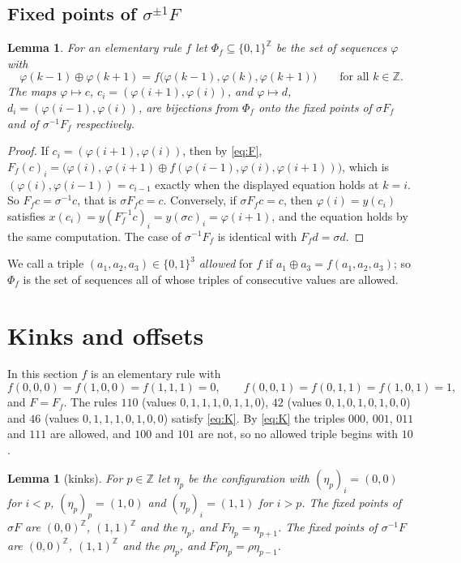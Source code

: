 \documentclass[11pt]{amsart}
\newtheorem{lemma}[theorem]{Lemma}
\theoremstyle{definition}
\theoremstyle{remark}
\theoremstyle{plain}
\newcommand{\Z}{\mathbb{Z}}
\newcommand{\sh}{\sigma}
\begin{document}
\subsection{Fixed points of \texorpdfstring{$\sh^{\pm1}F$}{sigma F}}\label{sec:fixed}

\begin{lemma}\label{cl:lem:Z2}
For an elementary rule $f$ let $\Phi_f\subseteq\{0,1\}^{\Z}$ be the set of sequences $\varphi$ with
\[
\varphi(k-1)\oplus\varphi(k+1)=f\bigl(\varphi(k-1),\varphi(k),\varphi(k+1)\bigr)\qquad\text{for all }k\in\Z.
\]
The maps $\varphi\mapsto c$, $c_i=(\varphi(i+1),\varphi(i))$, and $\varphi\mapsto d$, $d_i=(\varphi(i-1),\varphi(i))$, are bijections from $\Phi_f$ onto the fixed points of $\sh F_f$ and of $\sh^{-1}F_f$ respectively.
\end{lemma}

\begin{proof}
If $c_i=(\varphi(i+1),\varphi(i))$, then by \eqref{eq:F}, $F_f(c)_i=\bigl(\varphi(i),\,\varphi(i+1)\oplus f(\varphi(i-1),\varphi(i),\varphi(i+1))\bigr)$, which is $(\varphi(i),\varphi(i-1))=c_{i-1}$ exactly when the displayed equation holds at $k=i$. So $F_fc=\sh^{-1}c$, that is $\sh F_fc=c$. Conversely, if $\sh F_fc=c$, then $\varphi(i)=y(c_i)$ satisfies $x(c_i)=y(F_f^{-1}c)_i=y(\sh c)_i=\varphi(i+1)$, and the equation holds by the same computation. The case of $\sh^{-1}F_f$ is identical with $F_fd=\sh d$.
\end{proof}

We call a triple $(a_1,a_2,a_3)\in\{0,1\}^3$ \emph{allowed} for $f$ if $a_1\oplus a_3=f(a_1,a_2,a_3)$; so $\Phi_f$ is the set of sequences all of whose triples of consecutive values are allowed.

\section{Kinks and offsets}\label{sec:kinks}

In this section $f$ is an elementary rule with
\begin{equation}\label{eq:K}
f(0,0,0)=f(1,0,0)=f(1,1,1)=0,\qquad f(0,0,1)=f(0,1,1)=f(1,0,1)=1,
\end{equation}
and $F=F_f$. The rules $110$ (values $0,1,1,1,0,1,1,0$), $42$ (values $0,1,0,1,0,1,0,0$) and $46$ (values $0,1,1,1,0,1,0,0$) satisfy \eqref{eq:K}. By \eqref{eq:K} the triples $000$, $001$, $011$ and $111$ are allowed, and $100$ and $101$ are not, so no allowed triple begins with $10$.

\begin{lemma}[kinks]\label{cl:lem:kinks}
For $p\in\Z$ let $\eta_p$ be the configuration with $(\eta_p)_i=(0,0)$ for $i<p$, $(\eta_p)_p=(1,0)$ and $(\eta_p)_i=(1,1)$ for $i>p$. The fixed points of $\sh F$ are $(0,0)^{\Z}$, $(1,1)^{\Z}$ and the $\eta_p$, and $F\eta_p=\eta_{p+1}$. The fixed points of $\sh^{-1}F$ are $(0,0)^{\Z}$, $(1,1)^{\Z}$ and the $\rho\eta_p$, and $F\rho\eta_p=\rho\eta_{p-1}$.
\end{lemma}
\end{document}
